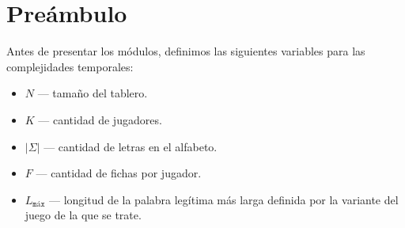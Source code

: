 \section{Preámbulo}
Antes de presentar los módulos, definimos las siguientes variables para las complejidades temporales:
\begin{itemize}
    \item $N$ \---- tamaño del tablero.
    \item $K$ \---- cantidad de jugadores.
    \item $|\Sigma|$ \---- cantidad de letras en el alfabeto.
    \item $F$ \---- cantidad de fichas por jugador.
    \item $L_{\texttt{máx}}$ \---- longitud de la palabra legítima más larga definida por la variante del juego de la que se trate.
\end{itemize}

